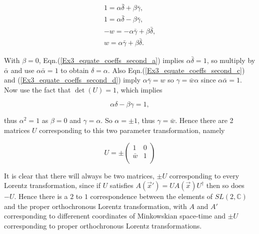 \begin{subequations}
\begin{gather}\label{Ex3_equate_coeffs_second_a}
1 = \alpha \bar{\delta} + \beta\bar{\gamma}, \\\label{Ex3_equate_coeffs_second_b}
1 = \alpha \bar{\delta} - \beta\bar{\gamma},\\\label{Ex3_equate_coeffs_second_c}
-w = -\alpha\bar{\gamma} + \beta \bar{\delta},\\\label{Ex3_equate_coeffs_second_d}
w= \alpha\bar{\gamma} + \beta \bar{\delta}. 
\end{gather}
\end{subequations}

\noindent With $\beta = 0$, Eqn.(\ref{Ex3_equate_coeffs_second_a}) implies $\alpha \bar{\delta} = 1$, so multiply by $\bar{\alpha}$ and use $\alpha \bar{\alpha} = 1$ to obtain $\delta = \alpha$. Also Eqn.(\ref{Ex3_equate_coeffs_second_c}) and (\ref{Ex3_equate_coeffs_second_d}) imply $\alpha \bar{\gamma} = w$ so $\gamma = \bar{w} \alpha$ since $\alpha \bar{\alpha} = 1$. Now use the fact that $\det{(U)} = 1$, which implies

\begin{equation*}
\alpha \delta - \beta \gamma = 1,
\end{equation*}

\noindent thus $\alpha^2 = 1$ as $\beta = 0$ and $\gamma = \alpha$. So $\alpha = \pm 1$, thus $\gamma = \bar{w}$. Hence there are 2 matrices $U$ corresponding to this two parameter transformation, namely

\begin{equation*}
U = \pm
\left(
\begin{array}{cc}
1       & 0 \\
\bar{w} & 1 \\
\end{array}
\right)
\end{equation*}

It is clear that there will always be two matrices, $\pm U$ corresponding to every Lorentz transformation, since if $U$ satisfies $A(\vec{x}') = U A(\vec{x}) U^{\dagger}$ then so does $-U$. Hence there is a $2$ to $1$ correspondence between the elements of $SL(2,\mathbb{C})$ and the proper orthochronous Lorentz transformation, with $A$ and $A'$ corresponding to differenent coordinates of Minkowskian space-time and $\pm U$ corresponding to proper orthochronous Lorentz transformations.  
